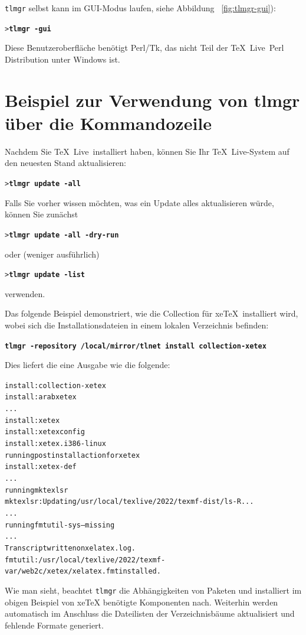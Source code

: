 \documentclass[12pt,ngerman,a4paper,fullparskip]{report}
\newcommand{\TL}{\TeX\ Live\xspace}
\newcommand{\prog}[1]{\texttt{#1}}
\newcommand{\Ucom}[1]{\textbf{\texttt{#1}}}
\providecommand*{\XeTeX}{xe\TeX\xspace}
\begin{document}
\prog{tlmgr} selbst kann im GUI-Modus laufen, siehe Abbildung
~\ref{fig:tlmgr-gui}):

\begin{alltt}
> \Ucom{tlmgr -gui}
\end{alltt}

Diese Benutzeroberfläche benötigt Perl/Tk, das nicht Teil der \TL\ Perl Distribution unter Windows ist.

\section{Beispiel zur Verwendung von tlmgr über die Kommandozeile}


Nachdem Sie \TL\ installiert haben, können Sie Ihr \TL-System auf den
neuesten Stand aktualisieren:
\begin{alltt}
> \Ucom{tlmgr update -all}
\end{alltt}
Falls Sie vorher wissen möchten, was ein Update alles aktualisieren würde, können Sie zunächst
\begin{alltt}
> \Ucom{tlmgr update -all -dry-run}
\end{alltt}
oder (weniger ausführlich)
\begin{alltt}
> \Ucom{tlmgr update -list}
\end{alltt}
verwenden.

Das folgende Beispiel demonstriert, wie die Collection für \XeTeX\ installiert
wird, wobei sich die Installationsdateien in einem lokalen Verzeichnis
befinden:
 
\begin{alltt}
\Ucom{tlmgr -repository /local/mirror/tlnet install collection-xetex}
\end{alltt}
Dies liefert die eine  Ausgabe wie die folgende:

\begin{alltt}\small
install: collection-xetex
install: arabxetex
...
install: xetex
install: xetexconfig
install: xetex.i386-linux
running post install action for xetex
install: xetex-def
...
running mktexlsr
mktexlsr: Updating /usr/local/texlive/2022/texmf-dist/ls-R...
...
running fmtutil-sys --missing
...
Transcript written on xelatex.log.
fmtutil: /usr/local/texlive/2022/texmf-var/web2c/xetex/xelatex.fmt installed.
\end{alltt}

Wie man sieht, beachtet \prog{tlmgr} die Abhängigkeiten von Paketen und installiert im obigen Beispiel von \XeTeX{} benötigte Komponenten nach. Weiterhin werden automatisch im Anschluss die Dateilisten der Verzeichnisbäume aktualisiert und fehlende Formate generiert.
\end{document}
